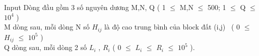 Input
Dòng đầu gồm 3 số nguyên dương M,N, Q ( 1  $\le$  M,N  $\le$  500; 1  $\le$  Q  $\le$  $10^{4}$ )
\\M dòng sau, mỗi dòng N số $H_{ij}$ là độ cao trung bình của block đất (i,j)  ( 0  $\le$  $H_{ij}$  $\le$  $10^{5}$ )
\\Q dòng sau, mỗi dòng 2 số $L_{i}$ , $R_{i}$ ( 0  $\le$  $L_{i}$  $\le$  $R_{i}$  $\le$  $10^{5}$ ).